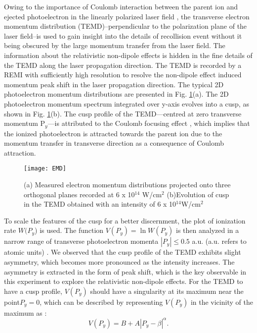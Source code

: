 \documentclass[aps,prl,twocolumn,superscriptaddress,amsmath,amssymb]{revtex4-1}
\begin{document}
 Owing to the importance of Coulomb interaction between the parent ion and ejected photoelectron in the linearly polarized laser field \cite{Brabec1996,Corkum1993,Blaga2009,Quan2009,Korneev2012,Liu2012}, the transverse electron momentum distribution (TEMD)--perpendicular to the polarization plane of the laser field--is used to gain insight into the details of recollision event without it being obscured by the large momentum transfer from the laser field. The information about the relativistic non-dipole effects is hidden in the fine details of the TEMD along the laser propagation direction. The TEMD is recorded by a REMI with sufficiently high resolution to resolve the non-dipole effect induced momentum peak shift in the laser propagation direction. The typical 2D photoelectron momentum distributions are presented in Fig. \ref{fig:EMD}(a). The 2D photoelectron momentum spectrum integrated over y-axis evolves into a cusp, as shown in Fig. \ref{fig:EMD}(b). The cusp profile of the TEMD---centred at zero transverse momentum P$_{y}$---is attributed to the Coulomb focusing effect \cite{Brabec1996,Rudenko2005,Comtois2005,Ivanov2016}, which implies that the ionized photoelectron is attracted towards the parent ion due to the momentum transfer in transverse direction as a consequence of Coulomb attraction. 
   
\begin{figure}[!ht]
\texttt{[image: EMD]}%
\caption{\label{fig:EMD}}(a) Measured electron momentum distributions projected onto three orthogonal planes recorded at 6 x 10$^{14}$ W/cm$^{2}$ (b)Evolution of cusp in the TEMD obtained with an intensity of 6 x 10$^{14}$W/cm$^{2}$
\end{figure} 

To scale the features of the cusp for a better discernment, the plot of ionization rate $W(P_{y}$) is used. The function $V(P_{y}) = \ln {W(P_{y})}$ is then analyzed in a narrow range of transverse photoelectron momenta $|P_{y}|\le 0.5$ a.u. (a.u. refers to atomic units) \cite{Ivanov2016}. We observed that the cusp profile of the TEMD exhibits slight asymmetry, which becomes more pronounced as the intensity increases. The asymmetry is extracted in the form of peak shift, which is the key observable in this experiment to explore the relativistic non-dipole effects.
For the TEMD to have a cusp profile, $V(P_{y})$ should have a singularity at its maximum near the point$P_{y}=0$, which can be described by representing $V(P_{y})$ in the vicinity of the maximum as  \cite{Ivanov2014,Ivanov2016}:
\begin{equation}
V(P_{y}) = B + A|P_{y} - \beta|^\alpha.
\end{equation}
\end{document}
